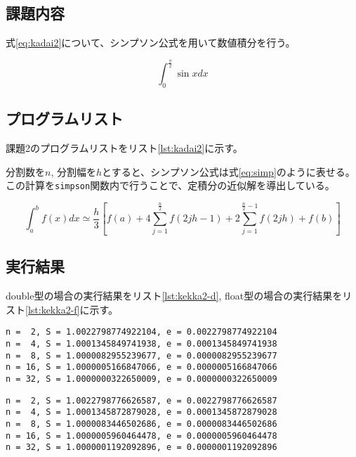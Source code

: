 \documentclass[a4j,titlepage]{jsarticle}
\begin{document}
\subsection{課題内容}
式\ref{eq:kadai2}について、シンプソン公式を用いて数値積分を行う。

\begin{equation}
  \int_0^\frac{\pi}{2} \sin x dx
  \label{eq:kadai2}
\end{equation}

\subsection{プログラムリスト}
課題2のプログラムリストをリスト\ref{lst:kadai2}に示す。

分割数を$n$, 分割幅を$h$とすると、シンプソン公式は式\ref{eq:simp}のように表せる。
この計算を\texttt{simpson}関数内で行うことで、定積分の近似解を導出している。

\begin{equation}
  \int_a^b f(x) dx \simeq \frac{h}{3} \left[ f(a) + 4 \sum_{j=1}^\frac{n}{2} f(2jh - 1)
  + 2 \sum_{j=1}^{\frac{n}{2}-1} f(2jh) + f(b) \right]
  \label{eq:simp}
\end{equation}



\subsection{実行結果}
double型の場合の実行結果をリスト\ref{lst:kekka2-d}, float型の場合の実行結果をリスト\ref{lst:kekka2-f}に示す。

\begin{lstlisting}[style=text,caption=課題2の実行結果（double型の場合）,label=lst:kekka2-d]
n =  2, S = 1.0022798774922104, e = 0.0022798774922104
n =  4, S = 1.0001345849741938, e = 0.0001345849741938
n =  8, S = 1.0000082955239677, e = 0.0000082955239677
n = 16, S = 1.0000005166847066, e = 0.0000005166847066
n = 32, S = 1.0000000322650009, e = 0.0000000322650009
\end{lstlisting}

\begin{lstlisting}[style=text,caption=課題2の実行結果（float型の場合）,label=lst:kekka2-f]
n =  2, S = 1.0022798776626587, e = 0.0022798776626587
n =  4, S = 1.0001345872879028, e = 0.0001345872879028
n =  8, S = 1.0000083446502686, e = 0.0000083446502686
n = 16, S = 1.0000005960464478, e = 0.0000005960464478
n = 32, S = 1.0000001192092896, e = 0.0000001192092896
\end{lstlisting}
\end{document}
